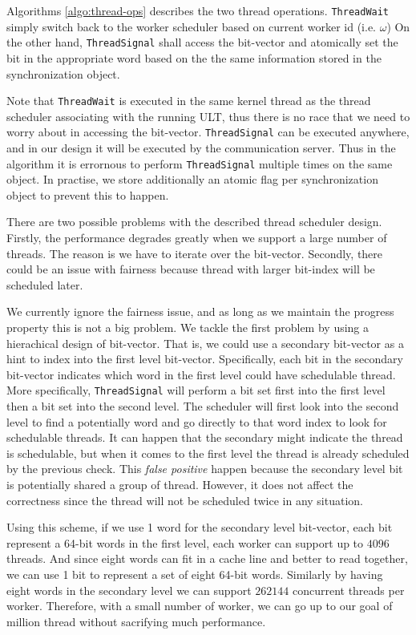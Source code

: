 \documentclass{sig-alternate-05-2015}
\begin{document}
Algorithms \ref{algo:thread-ops} describes the two thread operations.
\texttt{ThreadWait} simply switch back to the worker scheduler based on current worker id (i.e. $\omega$)
On the other hand, \texttt{ThreadSignal} shall access the
bit-vector and atomically set the bit in the appropriate word based on the
the same information stored in the synchronization object.

Note that \texttt{ThreadWait} is executed in the same kernel thread as the
thread scheduler associating with the running ULT, thus there is no race that
we need to worry about in accessing the bit-vector. \texttt{ThreadSignal} can
be executed anywhere, and in our design it will be executed by the
communication server. Thus in the algorithm it is errornous to perform
\texttt{ThreadSignal} multiple times on the same object. In practise, we store
additionally an atomic flag per synchronization object to prevent this to
happen.

There are two possible problems with the described thread scheduler design.
Firstly, the performance degrades greatly when we support a large number of
threads. The reason is we have to iterate over the bit-vector. Secondly, there
could be an issue with fairness because thread with larger bit-index will be
scheduled later.

We currently ignore the fairness issue, and as long as we maintain the progress
property this is not a big problem. We tackle the first problem by using a
hierachical design of bit-vector.  That is, we could use a secondary bit-vector
as a hint to index into the first level bit-vector.  Specifically, each bit in
the secondary bit-vector indicates which word in the first level could have
schedulable thread. More specifically, \texttt{ThreadSignal} will perform a bit
set first into the first level then a bit set into the second level. The
scheduler will first look into the second level to find a potentially word and
go directly to that word index to look for schedulable threads. It can happen
that the secondary might indicate the thread is schedulable, but when it comes
to the first level the thread is already scheduled by the previous check.  This
\textit{false positive} happen because the secondary level bit is potentially
shared a group of thread. However, it does not affect the correctness since the
thread will not be scheduled twice in any situation.

Using this scheme, if we use 1 word for the secondary level bit-vector, each
bit represent a 64-bit words in the first level, each worker can support up to
$4096$ threads. And since eight words can fit in a cache line and better to read
together, we can use 1 bit to represent a set of eight 64-bit words. Similarly by having
eight words in the secondary level we can support $262144$ concurrent threads per
worker. Therefore, with a small number of worker, we can go up to our goal of
million thread without sacrifying much performance.
\end{document}
